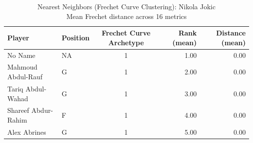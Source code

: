 \begin{table}[t]
\caption*{
{\fontsize{20}{25} Nearest Neighbors (Frechet Curve Clustering): Nikola Jokic\fontsize{12}{15}\selectfont } \\ 
{\fontsize{14}{17}\selectfont  Mean Frechet distance across 16 metrics\fontsize{12}{15}\selectfont }
} 
\fontsize{12.0pt}{14.0pt}\selectfont
\begin{tabular*}{\linewidth}{@{\extracolsep{\fill}}llcrr}
\toprule
Player & Position & Frechet Curve Archetype & Rank (mean) & Distance (mean) \\ 
\midrule\addlinespace[2.5pt]
No Name & NA & 1 & 1.00 & 0.00 \\ 
Mahmoud Abdul-Rauf & G & 1 & 2.00 & 0.00 \\ 
Tariq Abdul-Wahad & G & 1 & 3.00 & 0.00 \\ 
Shareef Abdur-Rahim & F & 1 & 4.00 & 0.00 \\ 
Alex Abrines & G & 1 & 5.00 & 0.00 \\ 
\bottomrule
\end{tabular*}
\end{table}

